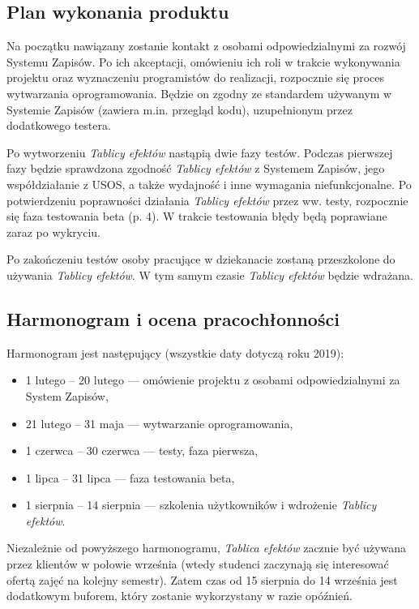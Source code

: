\documentclass{article}
\begin{document}
\subsection{Plan wykonania produktu}
Na początku nawiązany zostanie kontakt z osobami odpowiedzialnymi za rozwój Systemu Zapisów.
Po ich akceptacji, omówieniu ich roli w trakcie wykonywania projektu oraz wyznaczeniu programistów do realizacji, rozpocznie się proces wytwarzania oprogramowania.
Będzie on zgodny ze standardem używanym w Systemie Zapisów (zawiera m.in. przegląd kodu), uzupełnionym przez dodatkowego testera.

Po wytworzeniu \textit{Tablicy efektów} nastąpią dwie fazy testów.
Podczas pierwszej fazy będzie sprawdzona zgodność \textit{Tablicy efektów} z Systemem Zapisów, jego współdziałanie z USOS, a także wydajność i inne wymagania niefunkcjonalne.
Po potwierdzeniu poprawności działania \textit{Tablicy efektów} przez ww. testy, rozpocznie się faza testowania beta (p. 4).
W trakcie testowania błędy będą poprawiane zaraz po wykryciu.

Po zakończeniu testów osoby pracujące w dziekanacie zostaną przeszkolone do używania \textit{Tablicy efektów}.
W tym samym czasie \textit{Tablicy efektów} będzie wdrażana.

\subsection{Harmonogram i ocena pracochłonności}
Harmonogram jest następujący (wszystkie daty dotyczą roku 2019):
\begin{samepage}
\begin{itemize}
 \item 1 lutego -- 20 lutego --- omówienie projektu z osobami odpowiedzialnymi za System Zapisów,
 \item 21 lutego -- 31 maja --- wytwarzanie oprogramowania,
 \item 1 czerwca -- 30 czerwca --- testy, faza pierwsza,
 \item 1 lipca -- 31 lipca --- faza testowania beta,
 \item 1 sierpnia -- 14 sierpnia --- szkolenia użytkowników i wdrożenie \textit{Tablicy efektów}.
\end{itemize}
\end{samepage}
Niezależnie od powyższego harmonogramu, \textit{Tablica efektów} zacznie być używana przez klientów w połowie września (wtedy studenci zaczynają się interesować ofertą zajęć na kolejny semestr).
Zatem czas od 15 sierpnia do 14 września jest dodatkowym buforem, który zostanie wykorzystany w razie opóźnień.
\end{document}
